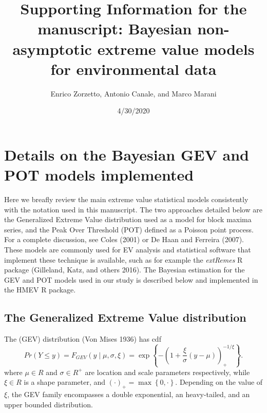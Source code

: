 \documentclass[]{article}
\title{Supporting Information for the manuscript: Bayesian non-asymptotic
extreme value models for environmental data}
\author{Enrico Zorzetto, Antonio Canale, and Marco Marani}
\date{4/30/2020}
\begin{document}
\maketitle

\renewcommand{\thefigure}{S\arabic{figure}}
 \renewcommand{\thetable}{S\arabic{table}}
 \renewcommand{\theequation}{S\arabic{equation}}

\hypertarget{details-on-the-bayesian-gev-and-pot-models-implemented}{%
\section{Details on the Bayesian GEV and POT models
implemented}\label{details-on-the-bayesian-gev-and-pot-models-implemented}}

Here we breafly review the main extreme value statistical models
consistently with the notation used in this manuscript. The two
approaches detailed below are the Generalized Extreme Value distribution
used as a model for block maxima series, and the Peak Over Threshold
(POT) defined as a Poisson point process. For a complete discussion, see
Coles (2001) or De Haan and Ferreira (2007). These models are commonly
used for EV analysis and statistical software that implement these
technique is available, such as for example the \emph{extRemes} R
package (Gilleland, Katz, and others 2016). The Bayesian estimation for
the GEV and POT models used in our study is described below and
implemented in the HMEV R package.

\hypertarget{the-generalized-extreme-value-distribution}{%
\subsection{The Generalized Extreme Value
distribution}\label{the-generalized-extreme-value-distribution}}

The (GEV) distribution (Von Mises 1936) has cdf \begin{equation}
    Pr \left(Y \le y\right) =  F_{GEV} \left(y \mid \mu, \sigma, \xi \right) = \exp \left\{ -\left( 1 + \frac{\xi}{\sigma}\left( y - \mu \right)
    \right)_{+}^{-1/\xi} \right\}.
    \label{eq:gev}
\end{equation} where \(\mu \in R\) and \(\sigma \in R^{+}\) are location
and scale parameters respectively, while \(\xi \in R\) is a shape
parameter, and \((\cdot)_{+} = \max\left\{ 0, \cdot \right\}\).
Depending on the value of \(\xi\), the GEV family encompasses a double
exponential, an heavy-tailed, and an upper bounded distribution.
\end{document}
